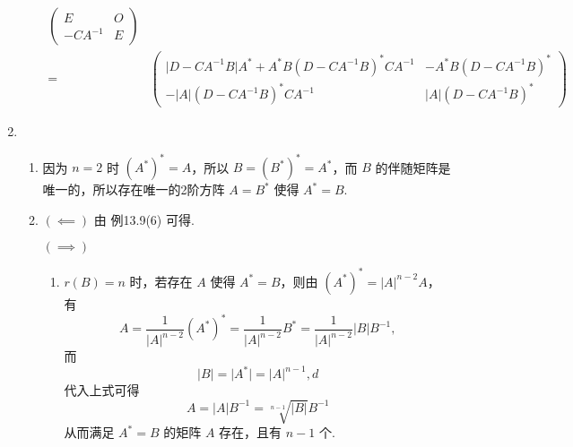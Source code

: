 \begin{enumerate}
\begin{enumerate}
\begin{align*}
                        \begin{pmatrix}
                            E        & O \\
                            -CA^{-1} & E
                        \end{pmatrix}                                                                                \\
                        ={} & \begin{pmatrix}
                                  \lvert D-CA^{-1}B \rvert A^*+A^*B(D-CA^{-1}B)^*CA^{-1} & -A^*B(D-CA^{-1}B)^*            \\
                                  -\lvert A \rvert (D-CA^{-1}B)^*CA^{-1}                 & \lvert A \rvert (D-CA^{-1}B)^*
                              \end{pmatrix} &
                    \end{align*}
          \end{enumerate}

    \item \begin{enumerate}
              \item 因为 $n=2$ 时 $(A^*)^* = A$，所以 $B = (B^*)^* = A^*$，而 $B$ 的伴随矩阵是唯一的，所以存在唯一的2阶方阵 $A = B^*$ 使得 $A^* = B$.

              \item $(\impliedby)$ 由 {例13.9(6)} 可得. %

                    $(\implies)$ \begin{enumerate}
                        \item $r(B) = n$ 时，若存在 $A$ 使得 $A^* = B$，则由 $(A^*)^* = \lvert A \rvert^{n-2}A$，有
                              \[A = \dfrac{1}{\lvert A \rvert^{n-2}}(A^*)^* = \dfrac{1}{\lvert A \rvert^{n-2}}B^* = \dfrac{1}{\lvert A \rvert^{n-2}}\lvert B \rvert B^{-1},\]
                              而
                              \[\lvert B \rvert = \lvert A^* \rvert = \lvert A \rvert^{n-1}, d\]
                              代入上式可得
                              \[A = \lvert A \rvert B^{-1} = \sqrt[n-1]{\lvert B \rvert} B^{-1}\]
                              从而满足 $A^* = B$ 的矩阵 $A$ 存在，且有 $n-1$ 个.


\end{enumerate}
\end{enumerate}
\end{enumerate}
